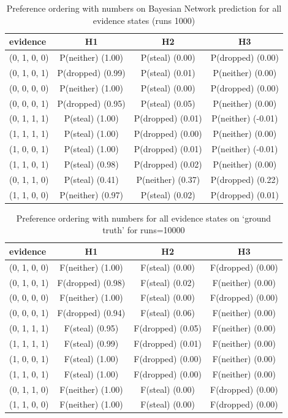 \documentclass[12pt]{article}
\begin{document}
\begin{table}[htbp]
\begin{center}
\begin{tabular}{|l|c|c|c|}
\hline
evidence & H1 & H2 & H3 \\
\hline
(0, 1, 0, 0)&P(neither) (1.00) & P(steal) (0.00) & P(dropped) (0.00) \\
(0, 1, 0, 1)&P(dropped) (0.99) & P(steal) (0.01) & P(neither) (0.00) \\
(0, 0, 0, 0)&P(neither) (1.00) & P(steal) (0.00) & P(dropped) (0.00) \\
(0, 0, 0, 1)&P(dropped) (0.95) & P(steal) (0.05) & P(neither) (0.00) \\
(0, 1, 1, 1)&P(steal) (1.00) & P(dropped) (0.01) & P(neither) (-0.01) \\
(1, 1, 1, 1)&P(steal) (1.00) & P(dropped) (0.00) & P(neither) (0.00) \\
(1, 0, 0, 1)&P(steal) (1.00) & P(dropped) (0.01) & P(neither) (-0.01) \\
(1, 1, 0, 1)&P(steal) (0.98) & P(dropped) (0.02) & P(neither) (0.00) \\
(0, 1, 1, 0)&P(steal) (0.41) & P(neither) (0.37) & P(dropped) (0.22) \\
(1, 1, 0, 0)&P(neither) (0.97) & P(steal) (0.02) & P(dropped) (0.01) \\
\hline
\end{tabular}
\end{center}
\caption{ Preference ordering with numbers on Bayesian Network prediction for all evidence states (runs 1000)}
\label{somebody}
\end{table}
\begin{table}[htbp]
\begin{center}
\begin{tabular}{|l|c|c|c|}
\hline
evidence & H1 & H2 & H3 \\
\hline
(0, 1, 0, 0)&F(neither) (1.00) & F(steal) (0.00) & F(dropped) (0.00) \\
(0, 1, 0, 1)&F(dropped) (0.98) & F(steal) (0.02) & F(neither) (0.00) \\
(0, 0, 0, 0)&F(neither) (1.00) & F(steal) (0.00) & F(dropped) (0.00) \\
(0, 0, 0, 1)&F(dropped) (0.94) & F(steal) (0.06) & F(neither) (0.00) \\
(0, 1, 1, 1)&F(steal) (0.95) & F(dropped) (0.05) & F(neither) (0.00) \\
(1, 1, 1, 1)&F(steal) (0.99) & F(dropped) (0.01) & F(neither) (0.00) \\
(1, 0, 0, 1)&F(steal) (1.00) & F(dropped) (0.00) & F(neither) (0.00) \\
(1, 1, 0, 1)&F(steal) (1.00) & F(dropped) (0.00) & F(neither) (0.00) \\
(0, 1, 1, 0)&F(neither) (1.00) & F(steal) (0.00) & F(dropped) (0.00) \\
(1, 1, 0, 0)&F(neither) (1.00) & F(steal) (0.00) & F(dropped) (0.00) \\
\hline
\end{tabular}
\end{center}
\caption{ Preference ordering with numbers for all evidence states on `ground truth' for runs=10000}
\label{heretic}
\end{table}
\end{document}
